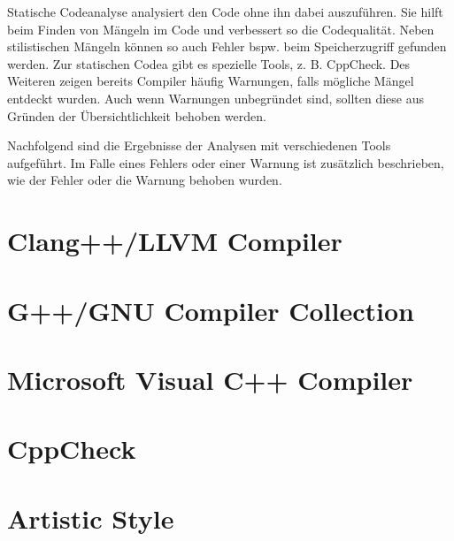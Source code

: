Statische Codeanalyse analysiert den Code ohne ihn dabei auszuführen. Sie hilft beim Finden von Mängeln im Code und verbessert so die Codequalität. Neben stilistischen Mängeln können so auch Fehler bspw. beim Speicherzugriff gefunden werden. Zur statischen Codea gibt es spezielle Tools, z. B. CppCheck. Des Weiteren zeigen bereits Compiler häufig Warnungen, falls mögliche Mängel entdeckt wurden. Auch wenn Warnungen unbegründet sind, sollten diese aus Gründen der Übersichtlichkeit behoben werden. \par
Nachfolgend sind die Ergebnisse der Analysen mit verschiedenen Tools aufgeführt. Im Falle eines Fehlers oder einer Warnung ist zusätzlich beschrieben, wie der Fehler oder die Warnung behoben wurden.

\section{Clang++/LLVM Compiler}

\section{G++/GNU Compiler Collection}

\section{Microsoft Visual C++ Compiler}

\section{CppCheck}

\section{Artistic Style}